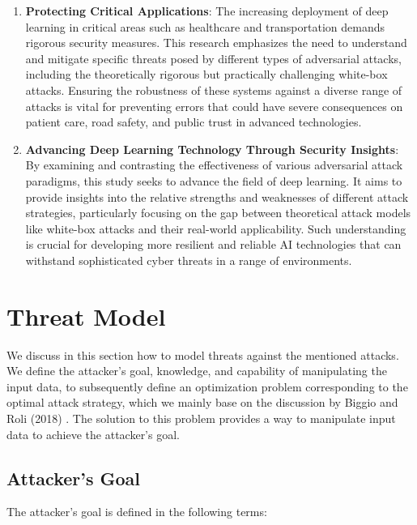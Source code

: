 \documentclass[10pt, conference, a4paper, final]{IEEEtran}
\begin{document}
\begin{enumerate}
    \item \textbf{Protecting Critical Applications}: The increasing deployment of deep learning in critical areas such as healthcare and transportation demands rigorous security measures. This research emphasizes the need to understand and mitigate specific threats posed by different types of adversarial attacks, including the theoretically rigorous but practically challenging white-box attacks. Ensuring the robustness of these systems against a diverse range of attacks is vital for preventing errors that could have severe consequences on patient care, road safety, and public trust in advanced technologies.
    
    \item \textbf{Advancing Deep Learning Technology Through Security Insights}: By examining and contrasting the effectiveness of various adversarial attack paradigms, this study seeks to advance the field of deep learning. It aims to provide insights into the relative strengths and weaknesses of different attack strategies, particularly focusing on the gap between theoretical attack models like white-box attacks and their real-world applicability. Such understanding is crucial for developing more resilient and reliable AI technologies that can withstand sophisticated cyber threats in a range of environments.
\end{enumerate}


\section{Threat Model}

We discuss in this section how to model threats against the mentioned attacks. We define the attacker’s goal, knowledge, and capability of manipulating the input data, to subsequently define an optimization problem corresponding to the optimal attack strategy, which we mainly base on the discussion by Biggio and Roli (2018) \cite{BR18}. The solution to this problem provides a way to manipulate input data to achieve the attacker’s goal.

\subsection{Attacker’s Goal}

The attacker’s goal is defined in the following terms:
\end{document}
